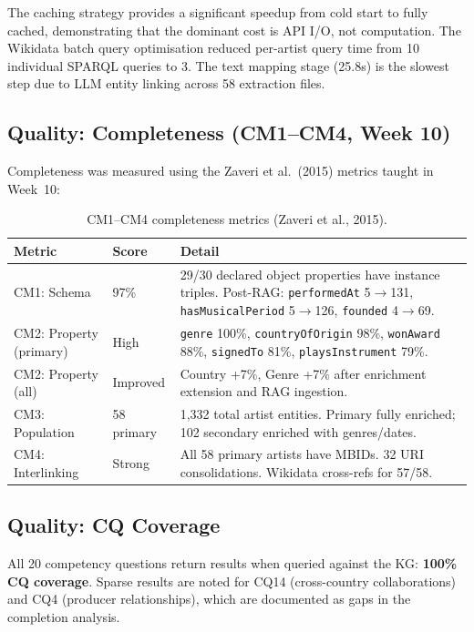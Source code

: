 \documentclass[11pt,a4paper]{article}
\begin{document}
The caching strategy provides a significant speedup from cold start to fully cached, demonstrating that the dominant cost is API I/O, not computation. The Wikidata batch query optimisation reduced per-artist query time from 10 individual SPARQL queries to 3. The text mapping stage (25.8s) is the slowest step due to LLM entity linking across 58 extraction files.

\subsection{Quality: Completeness (CM1--CM4, Week 10)}

Completeness was measured using the Zaveri et al.\ (2015) metrics taught in Week~10:

\begin{table}[h]
\centering
\small
\begin{tabular}{llp{7cm}}
\toprule
\textbf{Metric} & \textbf{Score} & \textbf{Detail} \\
\midrule
CM1: Schema & 97\% & 29/30 declared object properties have instance triples. Post-RAG: \texttt{performedAt} 5$\rightarrow$131, \texttt{hasMusicalPeriod} 5$\rightarrow$126, \texttt{founded} 4$\rightarrow$69. \\
CM2: Property (primary) & High & \texttt{genre} 100\%, \texttt{countryOfOrigin} 98\%, \texttt{wonAward} 88\%, \texttt{signedTo} 81\%, \texttt{playsInstrument} 79\%. \\
CM2: Property (all) & Improved & Country +7\%, Genre +7\% after enrichment extension and RAG ingestion. \\
CM3: Population & 58 primary & 1,332 total artist entities. Primary fully enriched; 102 secondary enriched with genres/dates. \\
CM4: Interlinking & Strong & All 58 primary artists have MBIDs. 32 URI consolidations. Wikidata cross-refs for 57/58. \\
\bottomrule
\end{tabular}
\caption{CM1--CM4 completeness metrics (Zaveri et al., 2015).}
\end{table}

\subsection{Quality: CQ Coverage}

All 20 competency questions return results when queried against the KG: \textbf{100\% CQ coverage}. Sparse results are noted for CQ14 (cross-country collaborations) and CQ4 (producer relationships), which are documented as gaps in the completion analysis.
\end{document}
